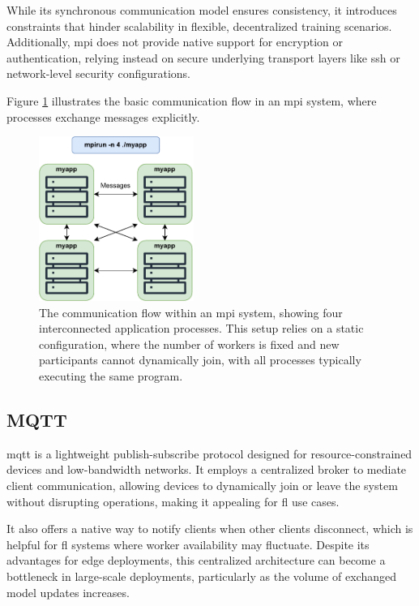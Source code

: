While its synchronous communication model ensures consistency, it introduces constraints that hinder scalability in flexible, decentralized training scenarios. Additionally, \ac{mpi} does not provide native support for encryption or authentication, relying instead on secure underlying transport layers like \ac{ssh} or network-level security configurations.

Figure \ref{fig:mpi_comm} illustrates the basic communication flow in an \ac{mpi} system, where processes exchange messages explicitly.

\begin{figure}[!htb]
    \centering
    \includegraphics[width=0.45\textwidth]{figs/mpi_comm.pdf}
    \caption[MPI Communication Flow]{The communication flow within an \ac{mpi} system, showing four interconnected application processes. This setup relies on a static configuration, where the number of workers is fixed and new participants cannot dynamically join, with all processes typically executing the same program.}
    \label{fig:mpi_comm}
\end{figure}

\subsection{MQTT}
\label{sec:mqtt}

\ac{mqtt} is a lightweight publish-subscribe protocol designed for resource-constrained devices and low-bandwidth networks. It employs a centralized broker to mediate client communication, allowing devices to dynamically join or leave the system without disrupting operations, making it appealing for \ac{fl} use cases. 

It also offers a native way to notify clients when other clients disconnect, which is helpful for \ac{fl} systems where worker availability may fluctuate. Despite its advantages for edge deployments, this centralized architecture can become a bottleneck in large-scale deployments, particularly as the volume of exchanged model updates increases. 

